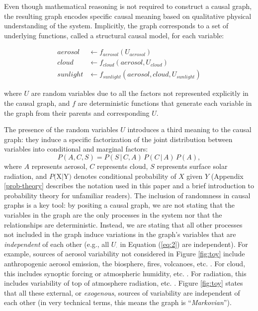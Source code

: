 \documentclass[12pt]{article}
\begin{document}
Even though mathematical reasoning is not required to construct a
causal graph, the resulting graph encodes specific causal meaning
based on qualitative physical understanding of the system. Implicitly,
the graph corresponds to a set of underlying functions, called a
structural causal model, for each variable:

\begin{align}
  \label{eq:2}
  aerosol &\leftarrow f_{aerosol} (U_{aerosol}) \\
  cloud &\leftarrow f_{cloud} (aerosol, U_{cloud})\\
  sunlight &\leftarrow f_{sunlight} (aerosol, cloud, U_{sunlight})
\end{align}

where $U$ are random variables due to all the factors not represented
explicitly in the causal graph, and $f$ are deterministic functions
that generate each variable in the graph from their parents and
corresponding $U$.

The presence of the random variables $U$ introduces a third meaning to
the causal graph: they induce a specific factorization of the joint
distribution between variables into conditional and marginal factors:
\begin{equation}
  P(A, C, S) = P(S \, | \,C, A) \, P(C \, | \, A) \, P(A),
\end{equation}
where $A$ represents aerosol, $C$ represents cloud, $S$ represents
surface solar radiation, and $P($X$ | $Y$)$ denotes conditional
probability of $X$ given $Y$ (Appendix \ref{prob-theory} describes the notation used in
this paper and a brief introduction to probability theory for
unfamiliar readers). The inclusion of randomness in causal graphs is a
key tool: by positing a causal graph, we are not stating that the
variables in the graph are the only processes in the system nor that the relationships are deterministic. Instead,
we are stating that all other processes not included in the graph
induce variations in the graph's variables that are \emph{independent} of
each other (e.g., all $U_{\cdot}$ in Equation (\ref{eq:2}) are
independent). For example, sources of aerosol variability not
considered in Figure \ref{fig:toy} include anthropogenic aerosol
emission, the biosphere, fires, volcanoes,
etc. \citep[e.g.,][]{Boucher2015}. For cloud, this includes synoptic
forcing or atmospheric humidity,
etc. \citep[e.g.,][]{wallace2006atmospheric}. For radiation, this
includes variability of top of atmosphere radiation,
etc. \citep[e.g.,][]{hartmann2015global}. Figure \ref{fig:toy} states
that all these external, or \textit{exogenous}, sources of variability
are independent of each other (in very technical terms, this means the
graph is ``\textit{Markovian}'').
\end{document}

